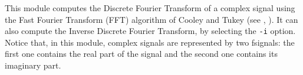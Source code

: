 This module computes the Discrete Fourier Transform of a complex signal 
using the Fast Fourier Transform (FFT) algorithm of Cooley and Tukey
(see \cite{cooley.tukey:fft}, \cite{press.flannery.ea:numerical}).
It can also compute the Inverse Discrete Fourier Transform, by selecting 
the \verb+-i+ option.
Notice that, in this module, complex signals are represented by two fsignals: 
the first one contains the real part of the signal and the second one 
contains its imaginary part. 

